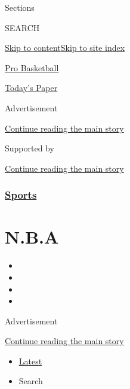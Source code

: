 Sections

SEARCH

\protect\hyperlink{site-content}{Skip to
content}\protect\hyperlink{site-index}{Skip to site index}

\href{https://www.nytimes3xbfgragh.onion/section/sports/basketball}{Pro
Basketball}

\href{https://myaccount.nytimes3xbfgragh.onion/auth/login?response_type=cookie\&client_id=vi}{}

\href{https://www.nytimes3xbfgragh.onion/section/todayspaper}{Today's
Paper}

Advertisement

\protect\hyperlink{after-top}{Continue reading the main story}

Supported by

\protect\hyperlink{after-sponsor}{Continue reading the main story}

\hypertarget{sports}{%
\subsubsection{\texorpdfstring{\href{/section/sports}{Sports}}{Sports}}\label{sports}}

\hypertarget{nba}{%
\section{N.B.A}\label{nba}}

\begin{itemize}
\item
\item
\item
\item
\end{itemize}

Advertisement

\protect\hyperlink{after-subheader}{Continue reading the main story}

\begin{itemize}
\tightlist
\item
  \protect\hyperlink{stream-panel}{Latest}
\item
  Search
\end{itemize}

